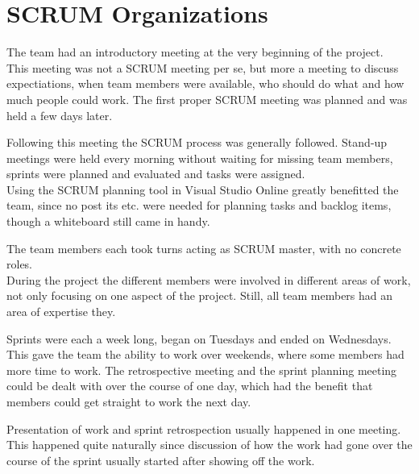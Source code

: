 \section{SCRUM Organizations}

The team had an introductory meeting at the very beginning of the project. \\
This meeting was not a SCRUM meeting per se, but more a meeting to discuss expectiations, when team members were available, who should do what and how much people could work.
The first proper SCRUM meeting was planned and was held a few days later.

Following this meeting the SCRUM process was generally followed. Stand-up meetings were held every morning without waiting for missing team members, sprints were planned and evaluated and tasks were assigned. \\
Using the SCRUM planning tool in Visual Studio Online greatly benefitted the team, since no post its etc. were needed for planning tasks and backlog items, though a whiteboard still came in handy.

The team members each took turns acting as SCRUM master, with no concrete roles.\\
During the project the different members were involved in different areas of work, not only focusing on one aspect of the project. Still, all team members had an area of expertise they.

Sprints were each a week long, began on Tuesdays and ended on Wednesdays.\\
This gave the team the ability to work over weekends, where some members had more time to work. The retrospective meeting and the sprint planning meeting could be dealt with over the course of one day, which had the benefit that members could get straight to work the next day.

Presentation of work and sprint retrospection usually happened in one meeting. This happened quite naturally since discussion of how the work had gone over the course of the sprint usually started after showing off the work.